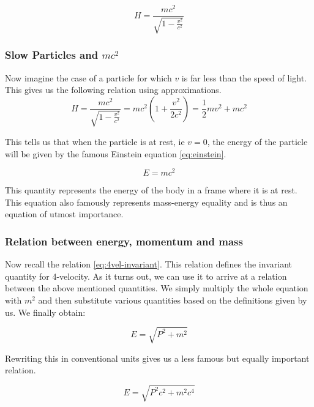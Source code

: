 \documentclass[16pt]{scrartcl}
\numberwithin{equation}{section}
\theoremstyle{plain}
\theoremstyle{definition}
\begin{document}
\begin{equation}
    H = \frac{mc^2}{\sqrt{1-\frac{v^2}{c^2}}}
    \label{eq:rel-energy-conventional}
\end{equation}

\subsubsection*{Slow Particles and $mc^2$}

Now imagine the case of a particle for which $v$ is far less than the speed of light. This gives us the following relation using approximations.
\begin{equation}
    H = \frac{mc^2}{\sqrt{1-\frac{v^2}{c^2}}} = mc^2 \left(1 + \frac{v^2}{2c^2} \right) = \frac{1}{2} mv^2 + mc^2
    \label{eq:rel-energy-slow}
\end{equation}

This tells us that when the particle is at rest, ie $v=0$, the energy of the particle will be given by the famous Einstein equation \eqref{eq:einstein}.

\begin{equation}
    E = mc^2
    \label{eq:einstein}
\end{equation}

This quantity represents the energy of the body in a frame where it is at rest. This equation also famously represents mass-energy equality and is thus an equation of utmost importance.

\subsubsection*{Relation between energy, momentum and mass}

Now recall the relation \eqref{eq:4vel-invariant}. This relation defines the invariant quantity for 4-velocity. As it turns out, we can use it to arrive at a relation between the above mentioned quantities. We simply multiply the whole equation with $m^2$ and then substitute various quantities based on the definitions given by us. We finally obtain:

\begin{equation}
    E = \sqrt{P^2+m^2}
    \label{eq:epm-relation}
\end{equation}

Rewriting this in conventional units gives us a less famous but equally important relation. 

\begin{equation}
    E = \sqrt{P^2c^2+m^2c^4}
    \label{eq:epm-relation-conventional}
\end{equation}
\end{document}
